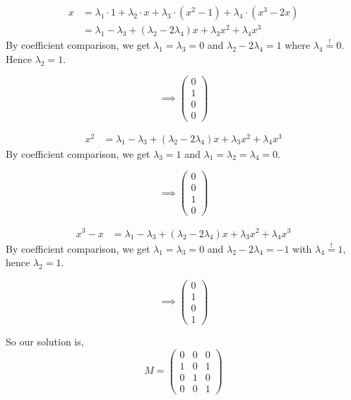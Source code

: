 \documentclass[a4paper]{article}
\theoremstyle{definition}
\begin{document}
\begin{align*}
  x &= \lambda_1 \cdot 1 + \lambda_2 \cdot x + \lambda_3 \cdot (x^2 - 1) + \lambda_4 \cdot (x^3 - 2x) \\
    &= \lambda_1 - \lambda_3 + (\lambda_2 - 2 \lambda_4) x + \lambda_3 x^2 + \lambda_4 x^3
\end{align*}
By coefficient comparison, we get $\lambda_1 = \lambda_3 = 0$ and $\lambda_2 - 2\lambda_4 = 1$ where $\lambda_4 \stackrel!= 0$. Hence $\lambda_2 = 1$.

\[ \implies \begin{pmatrix} 0 \\ 1 \\ 0 \\ 0 \end{pmatrix} \]

\begin{align*}
  x^2 &= \lambda_1 - \lambda_3 + (\lambda_2 - 2 \lambda_4) x + \lambda_3 x^2 + \lambda_4 x^3
\end{align*}
By coefficient comparison, we get $\lambda_3 = 1$ and $\lambda_1 = \lambda_2 = \lambda_4 = 0$.

\[ \implies \begin{pmatrix} 0 \\ 0 \\ 1 \\ 0 \end{pmatrix} \]

\begin{align*}
  x^3 - x &= \lambda_1 - \lambda_3 + (\lambda_2 - 2 \lambda_4) x + \lambda_3 x^2 + \lambda_4 x^3
\end{align*}
By coefficient comparison, we get $\lambda_1 = \lambda_3 = 0$ and $\lambda_2 - 2 \lambda_4 = -1$ with $\lambda_4 \stackrel!= 1$, hence $\lambda_2 = 1$.

\[ \implies \begin{pmatrix} 0 \\ 1 \\ 0 \\ 1 \end{pmatrix} \]

So our solution is,
\[
  M =
  \begin{pmatrix}
    0 & 0 & 0 \\
    1 & 0 & 1 \\
    0 & 1 & 0 \\
    0 & 0 & 1
  \end{pmatrix}
\]
\end{document}
